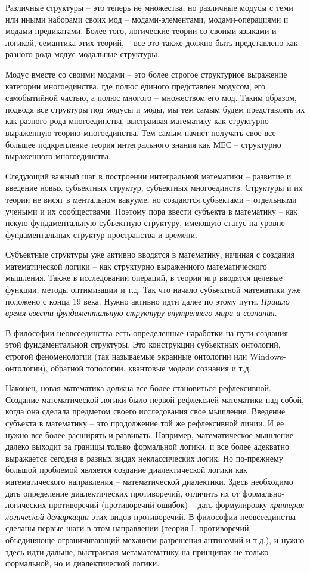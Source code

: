     Различные структуры – это теперь не множества, но различные модусы с теми или иными наборами своих мод – модами-элементами, модами-операциями и модами-предикатами. Более того, логические теории со своими языками и логикой, семантика этих теорий, – все это также должно быть представлено как разного рода модус-модальные структуры.

    Модус вместе со своими модами – это более строгое структурное выражение категории многоединства, где полюс единого представлен модусом, его самобытийной частью, а полюс многого – множеством его мод. Таким образом, подводя все структуры под модусы и моды, мы тем самым будем представлять их как разного рода многоединства, выстраивая математику как структурно выраженную теорию многоединства. Тем самым начнет получать свое все большее подкрепление теория интегрального знания как МЕС – структурно выраженного многоединства.

    Следующий важный шаг в построении интегральной математики – развитие и введение новых субъектных структур, субъектных многоединств. Структуры и их теории не висят в ментальном вакууме, но создаются субъектами – отдельными учеными и их сообществами. Поэтому пора ввести субъекта в математику – как некую фундаментальную субъектную структуру, имеющую статус на уровне фундаментальных структур пространства и времени.

    Субъектные структуры уже активно вводятся в математику, начиная с создания математической логики – как структурно выраженного математического мышления. Также в исследовании операций, в теории игр вводятся целевые функции, методы оптимизации и т.д. Так что начало субъектной математики уже положено с конца 19 века. Нужно активно идти далее по этому пути. \textit{Пришло время ввести фундаментальную структуру внутреннего мира и сознания}.

    В философии неовсеединства есть определенные наработки на пути создания этой фундаментальной структуры. Это конструкции субъектных онтологий, строгой феноменологии (так называемые экранные онтологии или Windows-онтологии), обратной топологии, квантовые модели сознания и т.д.

    Наконец, новая математика должна все более становиться рефлексивной. Создание математической логики было первой рефлексией математики над собой, когда она сделала предметом своего исследования свое мышление. Введение субъекта в математику – это продолжение той же рефлексивной линии. И ее нужно все более расширять и развивать. Например, математическое мышление далеко выходит за границы только формальной логики, и все более адекватно выражается сегодня в разных видах неклассических логик. Но по-прежнему большой проблемой является создание диалектической логики как математического направления – математической диалектики. Здесь необходимо дать определение диалектических противоречий, отличить их от формально-логических противоречий (противоречий-ошибок) – дать формулировку \textit{критерия логической демаркации} этих видов противоречий. В философии неовсеединства сделаны первые шаги в этом направлении (теория L-противоречий, объединяюще-ограничивающий механизм разрешения антиномий и т.д.), и нужно здесь идти дальше, выстраивая метаматематику на принципах не только формальной, но и диалектической логики.

